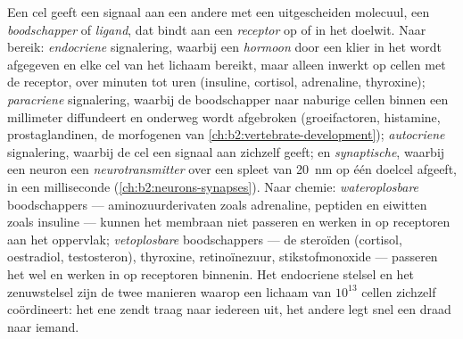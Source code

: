 \begin{definition}\label{def:b2:cell-signalling:kinds}
Een cel geeft een signaal aan een andere met een uitgescheiden molecuul, een
\emph{boodschapper} of \emph{ligand}, dat bindt aan een \emph{receptor} op
of in het doelwit. Naar bereik: \emph{endocriene} signalering, waarbij een
\emph{hormoon} door een klier in het  wordt afgegeven en elke cel van
het lichaam bereikt, maar alleen inwerkt op cellen met de receptor, over
minuten tot uren (insuline, cortisol, adrenaline, thyroxine);
\emph{paracriene} signalering, waarbij de boodschapper naar naburige cellen
binnen een millimeter diffundeert en onderweg wordt afgebroken
(groeifactoren, histamine, prostaglandinen, de morfogenen van
\cref{ch:b2:vertebrate-development}); \emph{autocriene} signalering, waarbij
de cel een signaal aan zichzelf geeft; en \emph{synaptische}, waarbij een
neuron een \emph{neurotransmitter} over een spleet van \qty{20}{nm} op één
doelcel afgeeft, in een milliseconde (\cref{ch:b2:neurons-synapses}).
Naar chemie: \emph{wateroplosbare} boodschappers --- aminozuurderivaten
zoals adrenaline, peptiden en eiwitten zoals insuline --- kunnen het membraan
niet passeren en werken in op receptoren aan het oppervlak;
\emph{vetoplosbare} boodschappers --- de steroïden (cortisol, oestradiol,
testosteron), thyroxine, retinoïnezuur, stikstofmonoxide --- passeren het wel
en werken in op receptoren binnenin. Het endocriene stelsel en het zenuwstelsel
zijn de twee manieren waarop een lichaam van $10^{13}$ cellen zichzelf
coördineert: het ene zendt traag naar iedereen uit, het andere legt snel
een draad naar iemand.
\end{definition}

